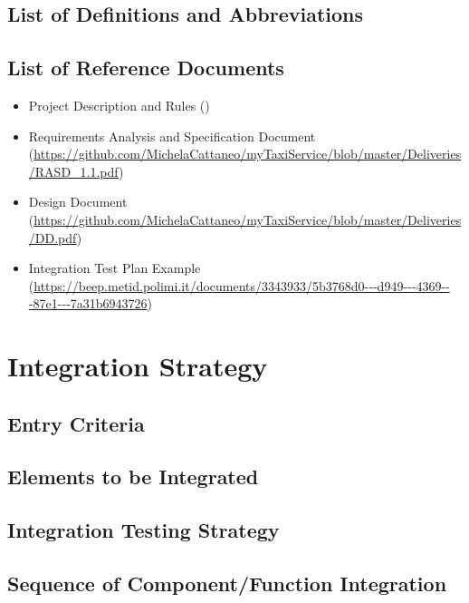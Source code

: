 \documentclass[18pt,oneside,a4paper, titlepage]{article}
\begin{document}
\subsection{List of	Definitions	and	Abbreviations}
\subsection{List of	Reference Documents}
\begin{itemize}
	\item Project Description and Rules (\url{})
	\item Requirements Analysis and Specification Document (\url{https://github.com/MichelaCattaneo/myTaxiService/blob/master/Deliveries/RASD_1.1.pdf})
	\item Design Document (\url{https://github.com/MichelaCattaneo/myTaxiService/blob/master/Deliveries/DD.pdf})
	\item Integration Test Plan Example (\url{https://beep.metid.polimi.it/documents/3343933/5b3768d0-­‐‑d949-­‐‑4369-­‐‑87e1-­‐‑7a31b6943726})
\end{itemize}
	
\section{Integration Strategy}
\subsection{Entry Criteria}		
\subsection{Elements to	be Integrated}
\subsection{Integration Testing Strategy}
\subsection{Sequence of	Component/Function Integration}
\end{document}
